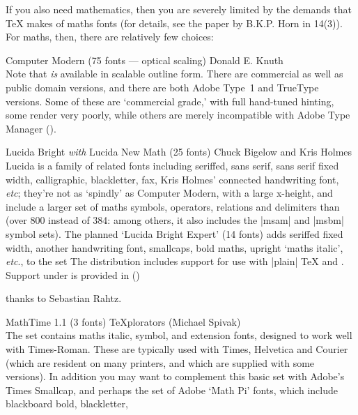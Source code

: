 If you also need mathematics, then you are severely limited by the
demands that \TeX{} makes of maths fonts (for details, see the paper by B.K.P. 
Horn in \TUGboat{} 14(3)).
For maths, then, there are relatively few choices:
\begin{booklist}
\item[Computer Modern] (75 fonts --- optical scaling) Donald E. Knuth\\
    Note that  \emph{is} available in scalable outline form.
    There are commercial as well as public domain versions, and
    there are both Adobe Type~1 and TrueType versions.
    Some of these are `commercial grade,' with full hand-tuned hinting,
    some render very poorly, while others are merely incompatible with 
    Adobe Type Manager ().
\item[Lucida Bright \emph{with} Lucida New Math] (25 fonts) Chuck Bigelow and
  Kris Holmes\\
    Lucida is a family of related fonts including seriffed, sans serif,
    sans serif fixed width, calligraphic, blackletter, fax,
    Kris Holmes' connected handwriting font, \emph{etc}; they're
    not as `spindly' as Computer Modern, with a large x-height, and
    include a larger set of maths symbols, operators, relations and
    delimiters than  (over 800 instead of 384: among others, it also
    includes the  |msam| and |msbm| symbol sets).
    The planned `Lucida Bright Expert' (14 fonts)
    adds seriffed fixed width, another handwriting font,
    smallcaps, bold maths, upright `maths italic', \emph{etc}., to the set
    The distribution includes support for use with |plain| \TeX{} and
    \LaTeXo{}.  Support under \LaTeXe{} is provided in
\htmlignore
     ()
\endhtmlignore
\begin{htmlversion}
\end{htmlversion}
    thanks to Sebastian Rahtz.
\item[MathTime 1.1] (3 fonts) \TeX{}plorators (Michael Spivak)\\
    The set contains maths italic, symbol, and extension
    fonts, designed to work well with Times-Roman.  These are
    typically used with Times, Helvetica and Courier (which are
    resident on many printers, and which are supplied with
    some  versions).  In addition you may want to complement this
    basic set with Adobe's Times Smallcap, and perhaps the set of
    Adobe `Math Pi' fonts, which include blackboard bold, blackletter,

\end{booklist}
